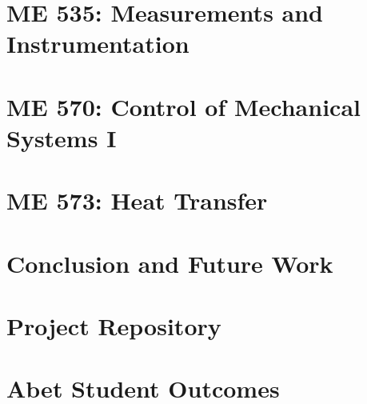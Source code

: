\documentclass[12pt]{report}
\begin{document}
    \chapter{ME 535: Measurements and Instrumentation}
    

    \chapter{ME 570: Control of Mechanical Systems I}
    

    \chapter{ME 573: Heat Transfer}
    
    
    \chapter{Conclusion and Future Work}
    

    \appendix
    \chapter{Project Repository}
    \label{appendix:appendix_github}
    

    \chapter{Abet Student Outcomes}
    \label{appendix:appendix_abet}
    


    
\end{document}
